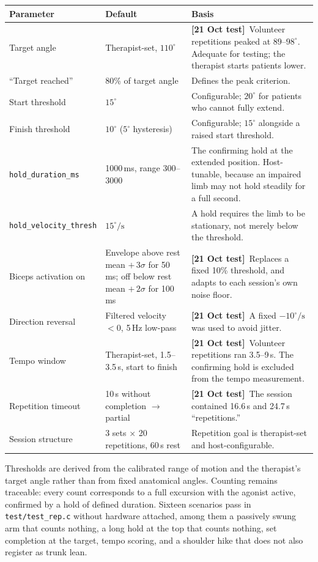 \documentclass[11pt]{article}
\newcommand{\tested}{{\sffamily\scriptsize\color{good}\textbf{[21 Oct test]}}\ }
\begin{document}
\begin{table}[!t]
\centering\small
\begin{tabularx}{\linewidth}{@{}p{34mm} p{32mm} X@{}}
\toprule
\textbf{Parameter} & \textbf{Default} & \textbf{Basis} \\
\midrule
Target angle & Therapist-set, $110^{\circ}$ &
\tested Volunteer repetitions peaked at $89$--$98^{\circ}$. Adequate for testing;
the therapist starts patients lower. \\
``Target reached'' & 80\% of target angle & Defines the peak criterion. \\
Start threshold & $15^{\circ}$ &
Configurable; $20^{\circ}$ for patients who cannot fully extend. \\
Finish threshold & $10^{\circ}$ ($5^{\circ}$ hysteresis) &
Configurable; $15^{\circ}$ alongside a raised start threshold. \\
\texttt{hold\_duration\_ms} & 1000\,ms, range 300--3000 &
The confirming hold at the extended position. Host-tunable, because an impaired
limb may not hold steadily for a full second. \\
\texttt{hold\_velocity\_thresh} & $15^{\circ}/\text{s}$ &
A hold requires the limb to be stationary, not merely below the threshold. \\
Biceps activation on & Envelope above rest mean $+\,3\sigma$ for 50\,ms; off below rest mean $+\,2\sigma$ for 100\,ms &
\tested Replaces a fixed 10\% threshold, and adapts to each session's own noise
floor. \\
Direction reversal & Filtered velocity $<0$, 5\,Hz low-pass &
\tested A fixed $-10^{\circ}/\text{s}$ was used to avoid jitter. \\
Tempo window & Therapist-set, 1.5--3.5\,s, start to finish &
\tested Volunteer repetitions ran 3.5--9\,s. The confirming hold is excluded
from the tempo measurement. \\
Repetition timeout & 10\,s without completion $\rightarrow$ partial &
\tested The session contained 16.6\,s and 24.7\,s ``repetitions.'' \\
Session structure & 3 sets $\times$ 20 repetitions, 60\,s rest &
Repetition goal is therapist-set and host-configurable. \\
\bottomrule
\end{tabularx}
\end{table}

\noindent
Thresholds are derived from the calibrated range of motion and the therapist's
target angle rather than from fixed anatomical angles. Counting remains
traceable: every count corresponds to a full excursion with the agonist active,
confirmed by a hold of defined duration. Sixteen scenarios pass in
\texttt{test/test\_rep.c} without hardware attached, among them a passively
swung arm that counts nothing, a long hold at the top that counts nothing, set
completion at the target, tempo scoring, and a shoulder hike that does not also
register as trunk lean.
\end{document}
